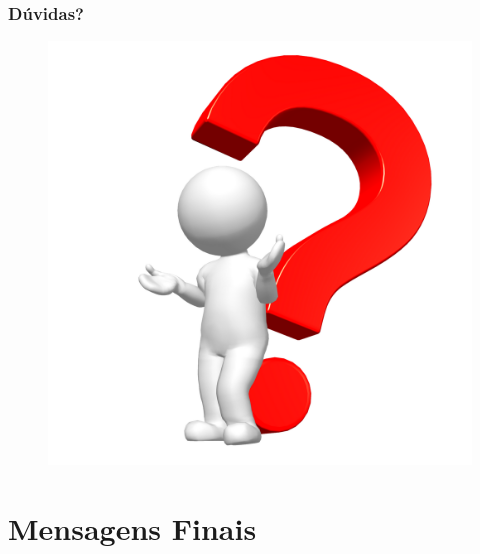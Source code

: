 \documentclass[aspectratio=169]{beamer}
\begin{document}
\begin{frame}\frametitle{Dúvidas?}
	\begin{figure}[h]
		\centering
		\includegraphics[height=0.6\paperheight]{pucrs-ec-poo-unidade_00-apresentacao_da_disciplina-laminas-duvidas.png}
	\end{figure}
\end{frame}

\section{Mensagens Finais}
\end{document}
